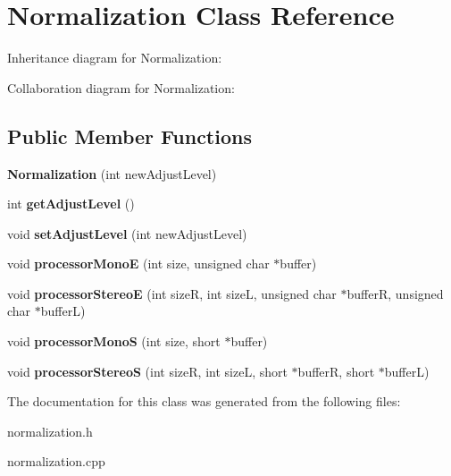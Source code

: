 \hypertarget{classNormalization}{}\section{Normalization Class Reference}
\label{classNormalization}


Inheritance diagram for Normalization\+:


Collaboration diagram for Normalization\+:
\subsection*{Public Member Functions}
\begin{DoxyCompactItemize}
\item 
\mbox{\label{classNormalization_ac4807a0ce2a2d845bd0a8fd0f1fac662}} 
{\bfseries Normalization} (int new\+Adjust\+Level)
\item 
\mbox{\label{classNormalization_a8e62b273415300146b260ec18561a448}} 
int {\bfseries get\+Adjust\+Level} ()
\item 
\mbox{\label{classNormalization_a4f80ce5334c763075e612688c03edd58}} 
void {\bfseries set\+Adjust\+Level} (int new\+Adjust\+Level)
\item 
\mbox{\label{classNormalization_a61d6afdd8530c60ef098c2e404841683}} 
void {\bfseries processor\+MonoE} (int size, unsigned char $\ast$buffer)
\item 
\mbox{\label{classNormalization_a27a14c9e1a86b55db654335e79c89782}} 
void {\bfseries processor\+StereoE} (int sizeR, int sizeL, unsigned char $\ast$bufferR, unsigned char $\ast$bufferL)
\item 
\mbox{\label{classNormalization_a432fc3b7ef40314bb4d7a215fddc8d0b}} 
void {\bfseries processor\+MonoS} (int size, short $\ast$buffer)
\item 
\mbox{\label{classNormalization_a3221f7132aa5feabc417fbf9ce97e290}} 
void {\bfseries processor\+StereoS} (int sizeR, int sizeL, short $\ast$bufferR, short $\ast$bufferL)
\end{DoxyCompactItemize}


The documentation for this class was generated from the following files\+:\begin{DoxyCompactItemize}
\item 
normalization.\+h\item 
normalization.\+cpp\end{DoxyCompactItemize}
